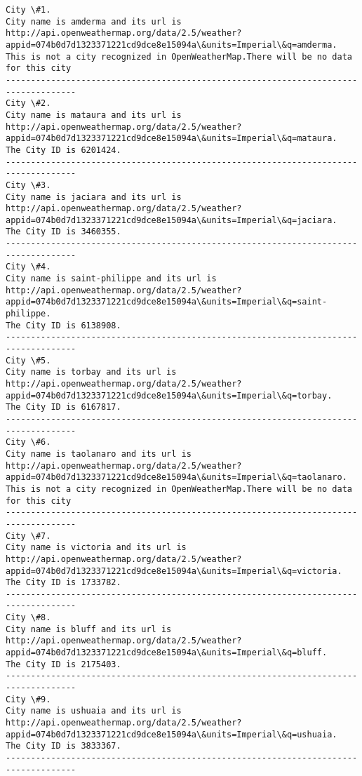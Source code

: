 \documentclass[11pt]{article}
\begin{document}
    \begin{Verbatim}[commandchars=\\\{\}]
City \#1.
City name is amderma and its url is http://api.openweathermap.org/data/2.5/weather?appid=074b0d7d1323371221cd9dce8e15094a\&units=Imperial\&q=amderma.
This is not a city recognized in OpenWeatherMap.There will be no data for this city
------------------------------------------------------------------------------------
City \#2.
City name is mataura and its url is http://api.openweathermap.org/data/2.5/weather?appid=074b0d7d1323371221cd9dce8e15094a\&units=Imperial\&q=mataura.
The City ID is 6201424.
------------------------------------------------------------------------------------
City \#3.
City name is jaciara and its url is http://api.openweathermap.org/data/2.5/weather?appid=074b0d7d1323371221cd9dce8e15094a\&units=Imperial\&q=jaciara.
The City ID is 3460355.
------------------------------------------------------------------------------------
City \#4.
City name is saint-philippe and its url is http://api.openweathermap.org/data/2.5/weather?appid=074b0d7d1323371221cd9dce8e15094a\&units=Imperial\&q=saint-philippe.
The City ID is 6138908.
------------------------------------------------------------------------------------
City \#5.
City name is torbay and its url is http://api.openweathermap.org/data/2.5/weather?appid=074b0d7d1323371221cd9dce8e15094a\&units=Imperial\&q=torbay.
The City ID is 6167817.
------------------------------------------------------------------------------------
City \#6.
City name is taolanaro and its url is http://api.openweathermap.org/data/2.5/weather?appid=074b0d7d1323371221cd9dce8e15094a\&units=Imperial\&q=taolanaro.
This is not a city recognized in OpenWeatherMap.There will be no data for this city
------------------------------------------------------------------------------------
City \#7.
City name is victoria and its url is http://api.openweathermap.org/data/2.5/weather?appid=074b0d7d1323371221cd9dce8e15094a\&units=Imperial\&q=victoria.
The City ID is 1733782.
------------------------------------------------------------------------------------
City \#8.
City name is bluff and its url is http://api.openweathermap.org/data/2.5/weather?appid=074b0d7d1323371221cd9dce8e15094a\&units=Imperial\&q=bluff.
The City ID is 2175403.
------------------------------------------------------------------------------------
City \#9.
City name is ushuaia and its url is http://api.openweathermap.org/data/2.5/weather?appid=074b0d7d1323371221cd9dce8e15094a\&units=Imperial\&q=ushuaia.
The City ID is 3833367.
------------------------------------------------------------------------------------

\end{Verbatim}
\end{document}
